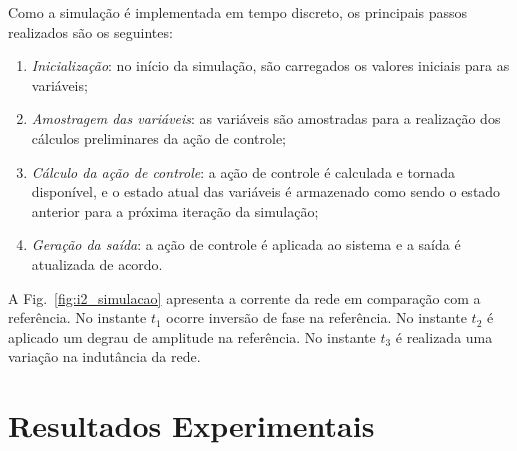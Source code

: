 	Como a simulação é implementada em tempo discreto, os principais passos realizados são os seguintes:

	\begin{enumerate}
		\item \textit{Inicialização}: no início da simulação, são carregados os valores iniciais para as variáveis;
		\item \textit{Amostragem das variáveis}: as variáveis são amostradas para a realização dos cálculos preliminares da ação de controle;
		\item \textit{Cálculo da ação de controle}: a ação de controle é calculada e tornada disponível, e o estado atual das variáveis é armazenado como sendo o estado anterior para a próxima iteração da simulação;
		\item \textit{Geração da saída}: a ação de controle é aplicada ao sistema e a saída é atualizada de acordo.
	\end{enumerate}

	A Fig.~\ref{fig:i2_simulacao} apresenta a corrente da rede em comparação com a referência. No instante $t_1$ ocorre inversão de fase na referência. No instante $t_2$ é aplicado um degrau de amplitude na referência. No instante $t_3$ é realizada uma variação na indutância da rede.

\section{Resultados Experimentais}



